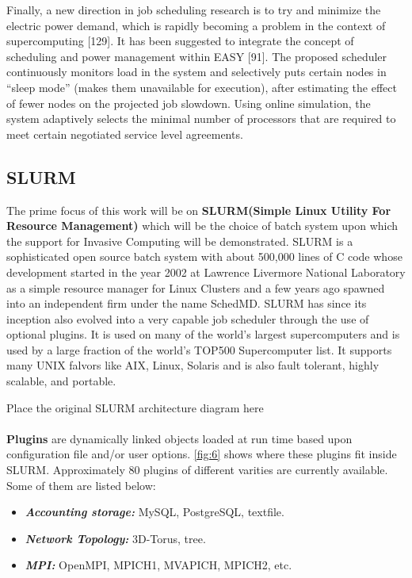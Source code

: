 Finally, a new direction in job scheduling research is to try and minimize the electric power demand, which is rapidly becoming a problem in the context of supercomputing [129]. It has been suggested to integrate the concept of scheduling and power management within EASY [91]. The proposed scheduler continuously monitors load in the system and selectively puts certain nodes in “sleep mode” (makes them unavailable for execution), after estimating the effect of fewer nodes on the projected job slowdown. Using online simulation, the system adaptively selects the minimal number of processors that are required to meet certain negotiated service level agreements.


\subsection{SLURM}
The prime focus of this work will be on \textbf{SLURM(Simple Linux Utility For Resource Management)} which will be the choice of batch system upon which the support for Invasive Computing will be demonstrated. SLURM is a sophisticated open source batch system with about 500,000 lines of C code whose development started in the year 2002 at Lawrence Livermore National Laboratory as a simple resource manager for Linux Clusters and a few years ago spawned into an independent firm under the name SchedMD. SLURM has since its inception also evolved into a very capable job scheduler through the use of optional plugins. It is used on many of the world's largest supercomputers and is used by a large fraction of the world's TOP500 Supercomputer list. It supports many UNIX falvors like AIX, Linux, Solaris and is also fault tolerant, highly scalable, and portable.\par
Place the original SLURM architecture diagram here\\
\noindent
\\
\textbf{Plugins} are dynamically linked objects loaded at run time based upon configuration file and/or user options. \ref{fig:6} shows where these plugins fit inside SLURM. Approximately $80$ plugins of different varities are currently available. Some of them are listed below:\\
\begin{itemize}
\item \textbf{\textit{Accounting storage:}} MySQL, PostgreSQL, textfile.
\item \textbf{\textit{Network Topology:}} 3D-Torus, tree.
\item \textbf{\textit{MPI:}} OpenMPI, MPICH1, MVAPICH, MPICH2, etc.
\end{itemize}
